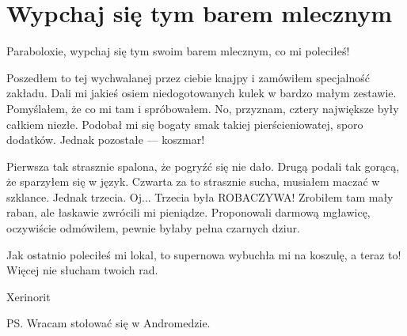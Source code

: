 \chapter{Wypchaj się tym barem mlecznym}


Paraboloxie, wypchaj się tym swoim barem mlecznym, co mi poleciłeś!

Poszedłem to tej wychwalanej przez ciebie knajpy i zamówiłem specjalność zakładu.
Dali mi jakieś osiem niedogotowanych kulek w bardzo małym zestawie.
Pomyślałem, że co mi tam i spróbowałem.
No, przyznam, cztery największe były całkiem niezłe. Podobał mi się bogaty smak takiej pierścieniowatej, sporo dodatków.
Jednak pozostałe --- koszmar!

Pierwsza tak strasznie spalona, że pogryźć się nie dało.
Drugą podali tak gorącą, że sparzyłem się w język.
Czwarta za to strasznie sucha, musiałem maczać w szklance.
Jednak trzecia. Oj... Trzecia była ROBACZYWA!
Zrobiłem tam mały raban, ale łaskawie zwrócili mi pieniądze.
Proponowali darmową mgławicę, oczywiście odmówiłem, pewnie byłaby pełna czarnych dziur.

Jak ostatnio poleciłeś mi lokal, to supernowa wybuchła mi na koszulę, a teraz to! Więcej nie słucham twoich rad.

Xerinorit

PS. Wracam stołować się w Andromedzie.
